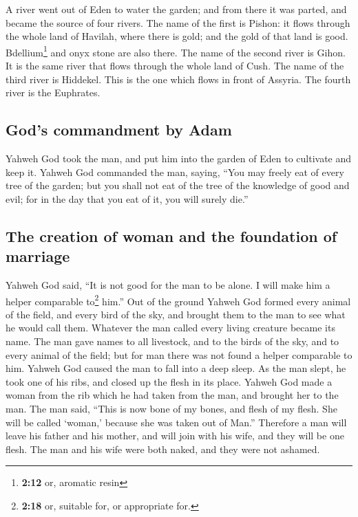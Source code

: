 \begin{paracol}{2}
\begin{otherlanguage}{english}
 A river went out of Eden to water the garden; and from
there it was parted, and became the source of four rivers.
 The name of the first is Pishon: it flows through the
whole land of Havilah, where there is gold;  and the gold
of that land is good. Bdellium\footnote{\textbf{2:12} or, aromatic resin}
and onyx stone are also there.  The name of the second
river is Gihon. It is the same river that flows through the whole land
of Cush.  The name of the third river is Hiddekel. This
is the one which flows in front of Assyria. The fourth river is the
Euphrates.

\hypertarget{gods-commandment-by-adam}{%
\subsection{God's commandment by Adam}\label{gods-commandment-by-adam}}

 Yahweh God took the man, and put him into the garden of
Eden to cultivate and keep it.  Yahweh God commanded the
man, saying, ``You may freely eat of every tree of the garden;
 but you shall not eat of the tree of the knowledge of
good and evil; for in the day that you eat of it, you will surely die.''

\hypertarget{the-creation-of-woman-and-the-foundation-of-marriage}{%
\subsection{The creation of woman and the foundation of
marriage}\label{the-creation-of-woman-and-the-foundation-of-marriage}}

 Yahweh God said, ``It is not good for the man to be
alone. I will make him a helper comparable to\footnote{\textbf{2:18} or,
  suitable for, or appropriate for.} him.''  Out of the
ground Yahweh God formed every animal of the field, and every bird of
the sky, and brought them to the man to see what he would call them.
Whatever the man called every living creature became its name.
 The man gave names to all livestock, and to the birds of
the sky, and to every animal of the field; but for man there was not
found a helper comparable to him.  Yahweh God caused the
man to fall into a deep sleep. As the man slept, he took one of his
ribs, and closed up the flesh in its place.  Yahweh God
made a woman from the rib which he had taken from the man, and brought
her to the man.  The man said, ``This is now bone of my
bones, and flesh of my flesh. She will be called `woman,' because she
was taken out of Man.''  Therefore a man will leave his
father and his mother, and will join with his wife, and they will be one
flesh.  The man and his wife were both naked, and they
were not ashamed.


\end{otherlanguage}
\end{paracol}
